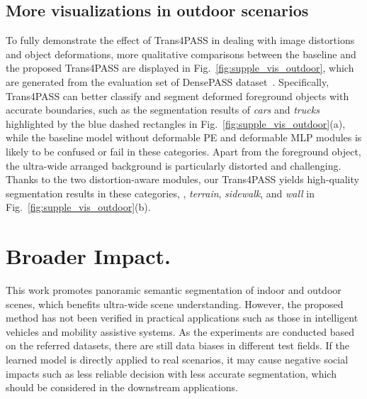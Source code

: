 \documentclass[final]{cvpr}
\begin{document}

\subsection{More visualizations in outdoor scenarios}
To fully demonstrate the effect of Trans4PASS in dealing with image distortions and object deformations, more qualitative comparisons between the baseline and the proposed Trans4PASS are displayed in Fig.~\ref{fig:supple_vis_outdoor}, which are generated from the evaluation set of DensePASS dataset~\cite{densepass}. Specifically, Trans4PASS can better classify and segment deformed foreground objects with accurate boundaries, such as the segmentation results of \emph{cars} and \emph{trucks} highlighted by the blue dashed rectangles in Fig.~\ref{fig:supple_vis_outdoor}(a), while the baseline model without deformable PE and deformable MLP modules is likely to be confused or fail in these categories. Apart from the foreground object, the ultra-wide arranged background is particularly distorted and challenging. Thanks to the two distortion-aware modules, our Trans4PASS yields high-quality segmentation results in these categories, \eg, \emph{terrain}, \emph{sidewalk}, and \emph{wall} in Fig.~\ref{fig:supple_vis_outdoor}(b).

\section{Broader Impact.} 
This work promotes panoramic semantic segmentation of indoor and outdoor scenes, which benefits ultra-wide scene understanding. However, the proposed method has not been verified in practical applications such as those in intelligent vehicles and mobility assistive systems. As the experiments are conducted based on the referred datasets, there are still data biases in different test fields. If the learned model is directly applied to real scenarios, it may cause negative social impacts such as less reliable decision with less accurate segmentation, which should be considered in the downstream applications. 
\end{document}
